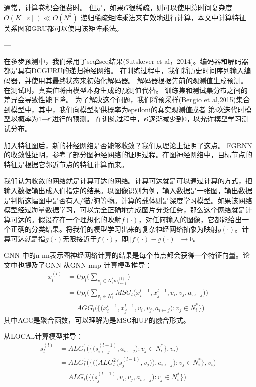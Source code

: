 通常，计算卷积会很费时。 但是，如果$G$很稀疏，则可以使用总时间复杂度 $O(K \mid \varepsilon \mid) \ll O(N^ 2)$ 递归稀疏矩阵乘法来有效地进行计算，本文中计算特征关系图和GRU都可以使用该矩阵乘法。

---

在多步预测中，我们采用了seq2seq结果(Sutskever et al，2014)。编码器和解码器都是具有DCGURU的递归神经网络。 在训练过程中，我们将历史时间序列输入编码器，并使用其最终状态来初始化解码器。 解码器根据先前的观测值生成预测。在测试时，真实值将由模型本身生成的预测值代替。 训练集和测试集分布之间的差异会导致性能下降。 为了解决这个问题，我们将预采样(Bengio et al,2015)集合到模型中，其中，我们向模型提供概率为epsiloni的真实观测值或者 第i次迭代时模型以概率为1−ϵi进行的预测。 在训练过程中，ϵi逐渐减少到0，以允许模型学习测试分布。

加入特征图后，新的神经网络是否能够收敛？我们从理论上证明了这点。
FGRNN的收敛性证明，参考了部分图神经网络的证明过程。在图神经网络中，目标节点的特征是根据它邻近节点的特征计算而来。

我们认为收敛的网络就是计算可达的网络。计算可达就是可以通过计算的方式，把输入数据输出成人们指定的结果。以图像识别为例，输入数据是一张图，输出数据是判断这幅图中是否有人/猫/狗等物。计算的载体则是深度学习模型。如果该网络模型经过海量数据学习，可以完全正确地完成图片分类任务，那么这个网络就是计算可达的。假设存在一个理想化的映射$f(\cdot)$，对任何输入的图像，它都能给出一个正确的分类结果。将我们的模型学习出来的复杂神经网络抽象为映射$g(\cdot)$。计算可达就是指$g(\cdot)$无限接近于$f(\cdot)$，即$||f(\cdot) - g(\cdot)|| \rightarrow 0$。

GNN 
 中的n nn表示图神经网络计算的结果是每个节点都会获得一个特征向量。论文中也提及了GNN 
从GNN map 计算模型推导：
\begin{equation}
  \begin{aligned} 
  x_i^{(l)} &= Up_l \big(\sum_{v_j \in N_i^* m_{i\leftarrow j}^{(l)}} \big) \\
    &= Up_l \big(\sum_{v_j \in N_i^*} MSG_l \big( x_i^{l-1}, x_j^{l-1}, v_i, v_j, a_{i\leftarrow j}\big) \big) \\
    &= AGG_l \big( \big\{ \big( x_i^{l-1}, x_j^{l-1}, v_i, v_j, a_{i\leftarrow j}\big) : v_j \in N_i^* \big\} \big)
  \end{aligned}  
\end{equation}
其中AGG是聚合函数，可以理解为是MSG和UP的融合形式。

从LOCAL计算模型推导：
\begin{equation}
  \begin{aligned}
    s_l^{(l)} &= ALG_l^1 \big( \big\{ \big( s_{i\leftarrow j}^{(l - 1)}, a_{i\leftarrow j}\big) : v_j \in N_i^* \big\}, v_i\big) \\
    &= ALG_l^1 \big( \big\{ \big( \big( ALG_l^2 \big( s_j^{(l-1)}, v_j\big) \big), a_{i\leftarrow j}\big) : v_j \in N_i^* \big\}, v_i\big) \\
    &= ALG_l \big(\big\{\big(s_j^{(l-1)}, v_i, v_j,  a_{i\leftarrow j}\big): v_j \in N_i^* \big\}\big)
  \end{aligned}
\end{equation}

